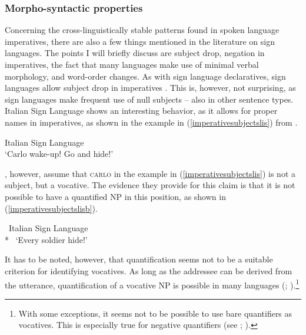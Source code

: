 \subsubsection{Morpho-syntactic properties}
Concerning the cross-linguistically stable patterns found in spoken language imperatives, there are also a few things mentioned in the literature on sign languages. The points I will briefly discuss are subject drop, negation in imperatives, the fact that many languages make use of minimal verbal morphology, and word-order changes. As with sign language declaratives, sign languages allow subject drop in imperatives \citep{ozsoy2014commands, donati2017searching}. This is, however, not surprising, as sign languages make frequent use of null subjects -- also in other sentence types. Italian Sign Language shows an interesting behavior, as it allows for proper names in imperatives, as shown in the example in (\ref{imperativesubjectslis}) from \citet[134]{donati2017searching}.

\begin{exe}
\ex Italian Sign Language \\ 
\glt `Carlo wake-up! Go and hide!' \label{imperativesubjectslis}
\end{exe}

\noindent \citet[134]{donati2017searching}, however, assume that \textsc{carlo} in the example in (\ref{imperativesubjectslis}) is not a subject, but a vocative. The evidence they provide for this claim is that it is not possible to have a quantified NP in this position, as shown in (\ref{imperativesubjectslisb}).

\begin{exe}
\ex \textcolor{white}{*}Italian Sign Language \\ *
\glt \textcolor{white}{*}`Every soldier hide!' \label{imperativesubjectslisb}
\end{exe}

\noindent It has to be noted, however, that quantification seems not to be a suitable criterion for identifying vocatives. As long as the addressee can be derived from the utterance, quantification of a vocative NP is possible in many languages (\citealt[194--197]{potsdam1996syntactic}; \citealt[815--816]{croitor2013constituents}).\footnote{ With some exceptions, it seems not to be possible to use bare quantifiers as vocatives. This is especially true for negative quantifiers (see \citealt[414--415]{portner2007structions}; \citealt[58--59]{hill2013vocatives}).}

